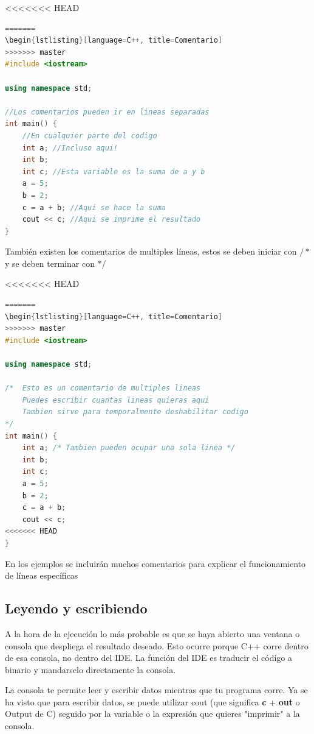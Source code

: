 \documentclass{article}
\begin{document}
<<<<<<< HEAD
\begin{lstlisting}[language=C++, title=Comentarios]
=======
\begin{lstlisting}[language=C++, title=Comentario]
>>>>>>> master
#include <iostream>

using namespace std;

//Los comentarios pueden ir en lineas separadas
int main() {
	//En cualquier parte del codigo
	int a; //Incluso aqui!
	int b;
	int c; //Esta variable es la suma de a y b
	a = 5;
	b = 2;
	c = a + b; //Aqui se hace la suma
	cout << c; //Aqui se imprime el resultado
}
\end{lstlisting}

También existen los comentarios de multiples líneas, estos se deben iniciar con $/*$ y se deben terminar con $*/$

<<<<<<< HEAD
\begin{lstlisting}[language=C++, title=Comentarios]
=======
\begin{lstlisting}[language=C++, title=Comentario]
>>>>>>> master
#include <iostream>

using namespace std;

/*  Esto es un comentario de multiples lineas
    Puedes escribir cuantas lineas quieras aqui
    Tambien sirve para temporalmente deshabilitar codigo
*/
int main() {
	int a; /* Tambien pueden ocupar una sola linea */
	int b;
	int c;
	a = 5;
	b = 2;
	c = a + b;
	cout << c;
<<<<<<< HEAD
}
\end{lstlisting}

En los ejemplos se incluirán muchos comentarios para explicar el funcionamiento de líneas específicas

\subsection{Leyendo y escribiendo}

A la hora de la ejecución lo más probable es que se haya abierto una ventana o consola que despliega el resultado deseado. Esto ocurre porque C++ corre dentro de esa consola, no dentro del IDE. La función del IDE es traducir el código a binario y mandarselo directamente la consola.

La consola te permite leer y escribir datos mientras que tu programa corre. Ya se ha visto que para escribir datos, se puede utilizar cout (que significa \textbf{c} + \textbf{out} o Output de C) seguido por la variable o la expresión que quieres "imprimir" a la consola.
\end{document}
